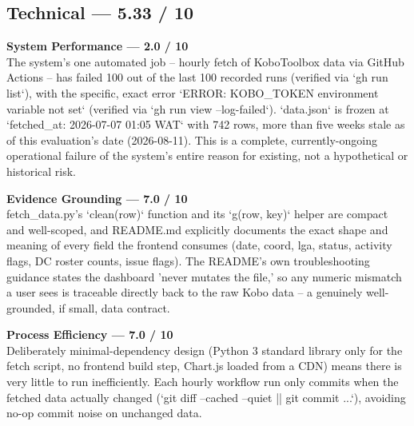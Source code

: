 \documentclass[12pt, a4paper]{article}
\newcounter{issue}
\begin{document}
\subsection{Technical --- 5.33 / 10}
\begin{mdframed}[style=alertbox]\textbf{System Performance --- 2.0 / 10}\\
The system's one automated job -- hourly fetch of KoboToolbox data via GitHub Actions -- has failed 100 out of the last 100 recorded runs (verified via `gh run list`), with the specific, exact error `ERROR: KOBO\_TOKEN environment variable not set` (verified via `gh run view --log-failed`). `data.json` is frozen at `fetched\_at: 2026-07-07 01:05 WAT` with 742 rows, more than five weeks stale as of this evaluation's date (2026-08-11). This is a complete, currently-ongoing operational failure of the system's entire reason for existing, not a hypothetical or historical risk.\end{mdframed}
\begin{mdframed}[style=greenbox]\textbf{Evidence Grounding --- 7.0 / 10}\\
fetch\_data.py's `clean(row)` function and its `g(row, key)` helper are compact and well-scoped, and README.md explicitly documents the exact shape and meaning of every field the frontend consumes (date, coord, lga, status, activity flags, DC roster counts, issue flags). The README's own troubleshooting guidance states the dashboard 'never mutates the file,' so any numeric mismatch a user sees is traceable directly back to the raw Kobo data -- a genuinely well-grounded, if small, data contract.\end{mdframed}
\begin{mdframed}[style=greenbox]\textbf{Process Efficiency --- 7.0 / 10}\\
Deliberately minimal-dependency design (Python 3 standard library only for the fetch script, no frontend build step, Chart.js loaded from a CDN) means there is very little to run inefficiently. Each hourly workflow run only commits when the fetched data actually changed (`git diff --cached --quiet || git commit ...`), avoiding no-op commit noise on unchanged data.\end{mdframed}
\end{document}
